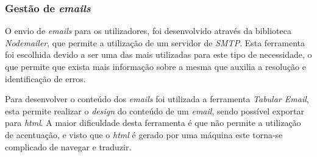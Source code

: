 \subsubsection{Gestão de \textit{emails}}\label{sec:emails_send}
O envio de \textit{emails} para os utilizadores, foi desenvolvido através da biblioteca \textit{Nodemailer}, que permite a utilização de um servidor de \textit{SMTP}. Esta ferramenta foi escolhida devido a ser uma das mais utilizadas para este tipo de necessidade, o que permite que exista mais informação sobre a mesma que auxilia a resolução e identificação de erros. 

Para desenvolver o conteúdo dos \textit{emails} foi utilizada a ferramenta \textit{Tabular Email}, esta permite realizar o \textit{design} do conteúdo de um \textit{email}, sendo possível exportar para \textit{html}. A maior dificuldade desta ferramenta é que não permite a utilização de acentuação, e visto que o \textit{html} é gerado por uma máquina este torna-se complicado de navegar e traduzir.